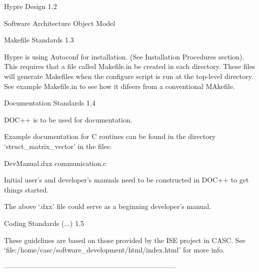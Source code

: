 \documentclass{article}
\begin{document}
\begin{cxxentry}
\begin{cxxentry}
\begin{cxxentry}
\begin{cxxdoc}
\end{cxxdoc}
\end{cxxentry}
\end{cxxentry}
\begin{cxxentry}
{}
        {Hypre Design}
        {}
        {}
        {1.2}
\begin{cxxnames}
\cxxitem{}
        {Software Architecture}
        {}
        {}
        {}
\label{cxx.1.2.1}
\cxxitem{}
        {Object Model}
        {}
        {}
        {}
\label{cxx.1.2.2}
\end{cxxnames}
\end{cxxentry}
\begin{cxxentry}
{}
        {Makefile Standards}
        {}
        {}
        {1.3}
\begin{cxxdoc}

Hypre is using Autoconf for installation.  (See Installation Procedures section).  This requires that a file called Makefile.in be created in each directory.  These files will generate Makefiles when the configure script is run at the top-level directory.  See example Makefile.in to see how it difeers from a conventional MAkefile.

\end{cxxdoc}
\end{cxxentry}
\begin{cxxentry}
{}
        {Documentation Standards}
        {}
        {}
        {1.4}
\begin{cxxdoc}
DOC++ is to be used for documentation.

Example documentation for C routines can be found in the directory
`struct_matrix_vector' in the files:

DevManual.dxx
communication.c

Initial user's and developer's manuals need to be constructed in
DOC++ to get things started.

The above `.dxx' file could serve as a beginning developer's manual.

\end{cxxdoc}
\end{cxxentry}
\begin{cxxentry}
{}
        {Coding Standards}
        {(...)}
        {}
        {1.5}
\begin{cxxdoc}
These guidelines are based on those provided by the ISE project in CASC.
See `file:/home/casc/software_development/html/index.html' for more info.

--------------------------------------------------------------------------


\end{cxxdoc}
\end{cxxentry}
\end{cxxentry}
\end{document}
